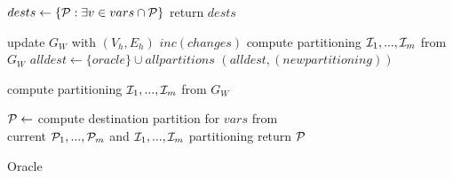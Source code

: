 \begin{algorithm}[t!]
\begin{distribalgo}[1]

\vspace{1.0mm}
	\STATE $dests \leftarrow \{ \mathcal{P} : \exists v \in vars \cap \mathcal{P} \}$
	\STATE return $dests$
\ENDINDENT

	\vspace{1.0mm}


	\STATE update $G_W$ with $(V_h,E_h)$
	\STATE $inc(changes)$
		\STATE compute partitioning $\mathcal{I}_1, ..., \mathcal{I}_m$ from $G_W$
		\STATE $alldest \leftarrow \{oracle\} \cup all partitions$
		\STATE \amcast$(alldest, (new partitioning))$
	\ENDIF
\ENDINDENT

\vspace{1.0mm}

	\STATE compute partitioning $\mathcal{I}_1, ..., \mathcal{I}_m$ from $G_W$
\ENDINDENT

\vspace{1.0mm}

	\STATE $\mathcal{P} \leftarrow$ compute destination partition for $vars$ from\\ \hspace{8mm}current $\mathcal{P}_1, ..., \mathcal{P}_m$ and $\mathcal{I}_1, ..., \mathcal{I}_m$ partitioning
	\STATE return $\mathcal{P}$
\ENDINDENT	
	

\caption{Oracle}
\label{alg:oracle_proxy}
\end{distribalgo}
\end{algorithm}



